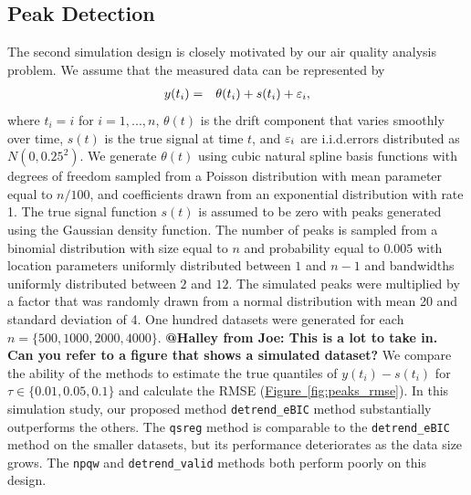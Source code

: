 \documentclass[12pt]{article}
\makeatletter
\newcommand{\Halley}[2]{{\bf {\color{purple}@Halley from #1: #2}}\xspace}
\newcommand{\Fig}[1]{\hyperref[fig:#1]{Figure~\ref*{fig:#1}}} %
\newcommand{\Fig}[1]{{Figure~\ref{fig:#1}}} %
\newcommand{\VE}[2]{\MakeLowercase{#1}_{#2}} %
\makeatother
\begin{document}
\subsection{Peak Detection}
	The second simulation design is closely motivated by our air quality analysis problem. We assume that the measured data can be represented by
	\begin{eqnarray*}
	y(t_i) & = & \theta(t_i) + s(t_i) + \VE{\varepsilon}{i},
	\end{eqnarray*}
	where $t_i = i$ for $i = 1, ..., n$, $\theta(t)$ is the drift component that varies smoothly over time, $s(t)$ is the true signal at time $t$, and $\VE{\varepsilon}{i}$ are i.i.d.\@ errors distributed as $N(0, 0.25^2)$. We generate $\theta(t)$ using cubic natural spline basis functions with degrees of freedom sampled from a Poisson distribution with mean parameter equal to $n/100$,  and coefficients drawn from an exponential distribution with rate 1. The true signal function $s(t)$ is assumed to be zero with peaks generated using the Gaussian density function. The number of peaks is sampled from a binomial distribution with size equal to $n$ and probability equal to $0.005$ with location parameters uniformly distributed between $1$ and $n-1$ and bandwidths uniformly distributed between $2$ and $12$. The simulated peaks were multiplied by a factor that was randomly drawn from a normal distribution with mean 20 and standard deviation of 4. One hundred datasets were generated for each $n=\{500, 1000, 2000, 4000\}$. \Halley{Joe}{This is a lot to take in. Can you refer to a figure that shows a simulated dataset?} We compare the ability of the methods to estimate the true quantiles of $y(t_i)-s(t_i)$  for $\tau \in \{0.01, 0.05, 0.1\}$ and calculate the RMSE (\Fig{peaks_rmse}). In this simulation study, our proposed method \texttt{detrend\_eBIC} method substantially outperforms the others. The \texttt{qsreg} method is comparable to the \texttt{detrend\_eBIC} method on the smaller datasets, but its performance deteriorates as the data size grows. The \texttt{npqw} and \texttt{detrend\_valid} methods both perform poorly on this design.
\end{document}
